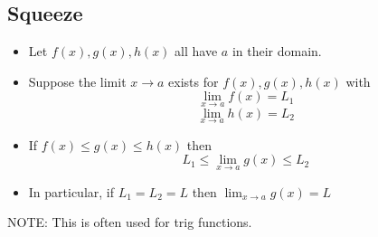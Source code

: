 \documentclass[20pt]{extarticle}
\begin{document}
\subsection*{\textbf{\color{draculaorange}Squeeze}}
\begin{itemize}
  \item{Let $f(x), g(x), h(x)$ all have \(a\) in their domain.}
  \item{Suppose the limit $x \rightarrow a$ exists for $f(x), g(x), h(x)$ with
   $$\lim _{x \rightarrow a} f(x)=L_1$$
   $$\lim _{x \to a} h(x)=L_2$$
   }
  \item{If $f(x) \leq g(x) \leq h(x)$ then
  \[L_1\leq \lim _{x \to a} g(x)\leq L_2\]}
  \item{In particular, if $L_1=L_2=L $ then $ \lim _{x \rightarrow a} g(x)=L$}
\end{itemize}

NOTE: This is often used for trig functions.
\end{document}
